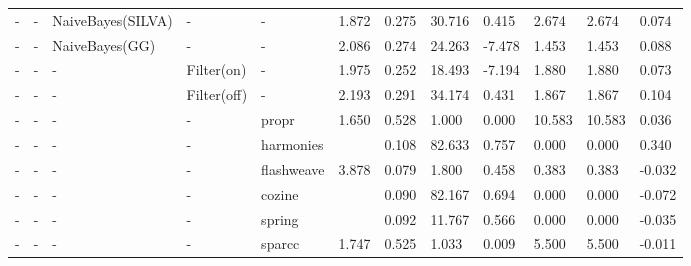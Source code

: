 \begin{table}[]
\begin{tabular}{|l|l|l|l|l|l|l|l|l|l|l|l|}
  -  & -             & NaiveBayes(SILVA) & -           & -          & 1.872                        & 0.275              & 30.716                      & 0.415      & 2.674             & 2.674             & 0.074                            \\
  -  & -             & NaiveBayes(GG)    & -           & -          & 2.086                        & 0.274              & 24.263                      & -7.478     & 1.453             & 1.453             & 0.088                            \\
  -  & -             & -                 & Filter(on)  & -          & 1.975                        & 0.252              & 18.493                      & -7.194     & 1.880             & 1.880             & 0.073                            \\
  -  & -             & -                 & Filter(off) & -          & 2.193                        & 0.291              & 34.174                      & 0.431      & 1.867             & 1.867             & 0.104                            \\
  -  & -             & -                 & -           & propr      & 1.650                        & 0.528              & 1.000                       & 0.000      & 10.583            & 10.583            & 0.036                            \\
  -  & -             & -                 & -           & harmonies  &                              & 0.108              & 82.633                      & 0.757      & 0.000             & 0.000             & 0.340                            \\
  -  & -             & -                 & -           & flashweave & 3.878                        & 0.079              & 1.800                       & 0.458      & 0.383             & 0.383             & -0.032                           \\
  -  & -             & -                 & -           & cozine     &                              & 0.090              & 82.167                      & 0.694      & 0.000             & 0.000             & -0.072                           \\
  -  & -             & -                 & -           & spring     &                              & 0.092              & 11.767                      & 0.566      & 0.000             & 0.000             & -0.035                           \\
  -  & -             & -                 & -           & sparcc     & 1.747                        & 0.525              & 1.033                       & 0.009      & 5.500             & 5.500             & -0.011                           \\

\end{tabular}
\end{table}

